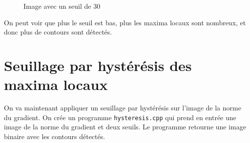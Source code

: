 \documentclass[french,a4paper,10pt]{article}
\begin{document}
\begin{figure}[!htb]
\begin{minipage}{0.3\textwidth}
            \caption{Image avec un seuil de 30}\label{Fig:maxima-30-peppers-grey}
        \end{minipage}
    \end{figure}

    On peut voir que plus le seuil est bas, plus les maxima locaux sont nombreux, et donc plus de contours sont
    détectés.

    \newpage
    \section{Seuillage par hystérésis des maxima locaux}\label{sec:3}

    On va maintenant appliquer un seuillage par hystérésis sur l'image de la norme du gradient.
    On crée un programme \texttt{hysteresis.cpp} qui prend en entrée une image de la norme du gradient et deux seuils.
    Le programme retourne une image binaire avec les contours détectés.
\end{document}
